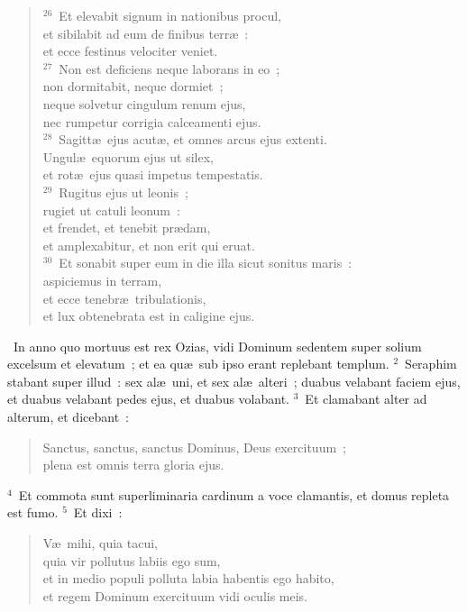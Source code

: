 \begin{flushleft}
\begin{verse}
${}^{26}$~Et elevabit signum in nationibus procul,\\ et sibilabit ad eum de finibus terr\ae~:\\ et ecce festinus velociter veniet.\\
${}^{27}$~Non est deficiens neque laborans in eo~;\\ non dormitabit, neque dormiet~;\\ neque solvetur cingulum renum ejus,\\ nec rumpetur corrigia calceamenti ejus.\\
${}^{28}$~Sagitt\ae\ ejus acut\ae , et omnes arcus ejus extenti.\\ Ungul\ae\ equorum ejus ut silex,\\ et rot\ae\ ejus quasi impetus tempestatis.\\
${}^{29}$~Rugitus ejus ut leonis~;\\ rugiet ut catuli leonum~:\\ et frendet, et tenebit pr\ae dam,\\ et amplexabitur, et non erit qui eruat.\\
${}^{30}$~Et sonabit super eum in die illa sicut sonitus maris~:\\ aspiciemus in terram,\\ et ecce tenebr\ae\ tribulationis,\\ et lux obtenebrata est in caligine ejus.\end{verse}\end{flushleft}


~In anno quo mortuus est rex Ozias, vidi Dominum sedentem super solium excelsum et elevatum~; et ea qu\ae\ sub ipso erant replebant templum.
${}^{2}$~Seraphim stabant super illud~: sex al\ae\ uni, et sex al\ae\ alteri~; duabus velabant faciem ejus, et duabus velabant pedes ejus, et duabus volabant.
${}^{3}$~Et clamabant alter ad alterum, et dicebant~: \begin{flushleft}\begin{verse}Sanctus, sanctus, sanctus Dominus, Deus exercituum~;\\ plena est omnis terra gloria ejus.\end{verse}\end{flushleft}


${}^{4}$~Et commota sunt superliminaria cardinum a voce clamantis, et domus repleta est fumo.
${}^{5}$~Et dixi~: \begin{flushleft}\begin{verse}V\ae\ mihi, quia tacui,\\ quia vir pollutus labiis ego sum,\\ et in medio populi polluta labia habentis ego habito,\\ et regem Dominum exercituum vidi oculis meis.\end{verse}\end{flushleft}


